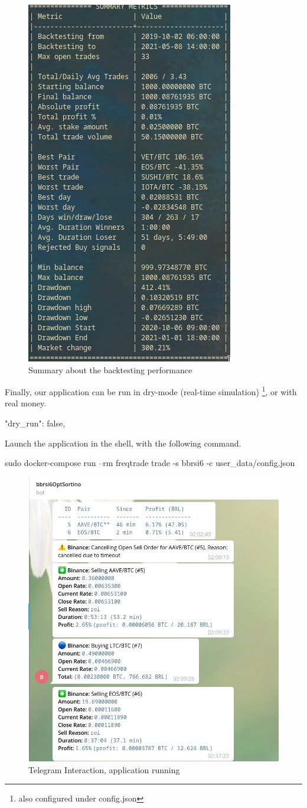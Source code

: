 \documentclass[
12pt,				%
openright,			%
oneside,			%
a4paper,			%
brazil,				%
english,			%
]{abntex2}
\begin{document}
\begin{figure}[ht]
  \centering
    \caption{\label{fig:freqtrade-running} Summary about the backtesting performance}
  \includegraphics[width=0.3\linewidth]{Imagens/freqtrade5.jpeg}
\end{figure}

Finally, our application can be run in dry-mode (real-time simulation) \footnote{also configured under config.json}, or with real money.

\begin{python}
"dry_run": false,
\end{python}

Launch the application in the shell, with the following command.
\begin{shell}
sudo docker-compose run --rm freqtrade trade -s bbrsi6 -c user_data/config.json
\end{shell}

\begin{figure}[ht]
  \centering
    \caption{\label{fig:freqtrade-running} Telegram Interaction, application running}
    \includegraphics[width=0.45\linewidth]{Imagens/freqtrade1.jpeg}
\end{figure}
\end{document}
